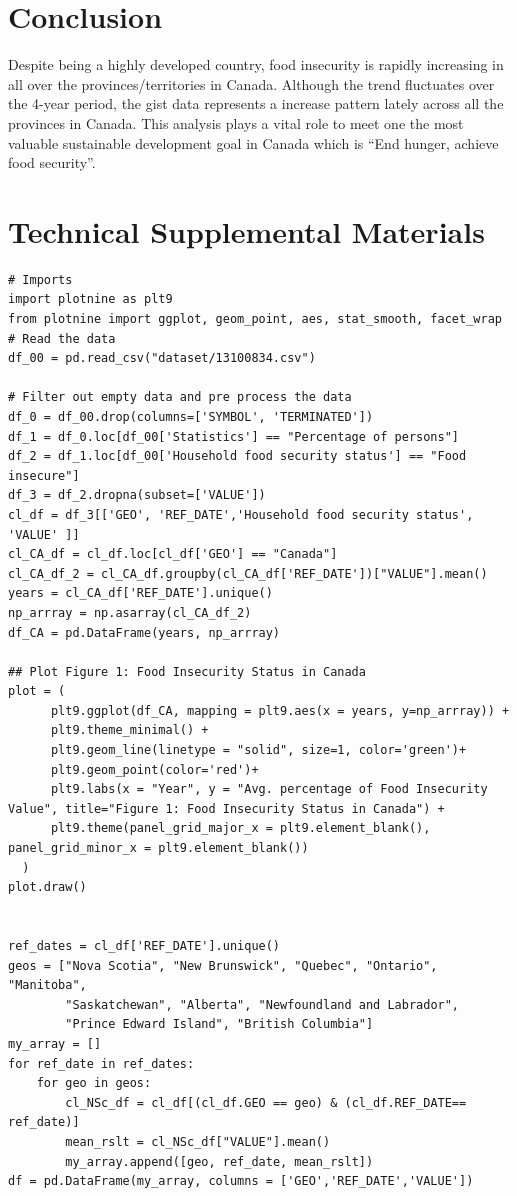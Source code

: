 \documentclass[11pt]{article}
\begin{document}
\section{Conclusion}
Despite being a highly developed country, food insecurity is rapidly increasing in all over the provinces/territories in Canada. Although the trend fluctuates over the 4-year period, the gist data represents a increase pattern lately across all the provinces in Canada. This analysis plays a vital role to meet one the most valuable sustainable development goal in Canada which is ``End hunger, achieve food security''. 

\newpage
\section{Technical Supplemental Materials}
\begin{verbatim}
# Imports
import plotnine as plt9
from plotnine import ggplot, geom_point, aes, stat_smooth, facet_wrap
# Read the data
df_00 = pd.read_csv("dataset/13100834.csv")

# Filter out empty data and pre process the data
df_0 = df_00.drop(columns=['SYMBOL', 'TERMINATED'])
df_1 = df_0.loc[df_00['Statistics'] == "Percentage of persons"]
df_2 = df_1.loc[df_00['Household food security status'] == "Food insecure"]
df_3 = df_2.dropna(subset=['VALUE'])
cl_df = df_3[['GEO', 'REF_DATE','Household food security status', 'VALUE' ]]
cl_CA_df = cl_df.loc[cl_df['GEO'] == "Canada"]
cl_CA_df_2 = cl_CA_df.groupby(cl_CA_df['REF_DATE'])["VALUE"].mean()
years = cl_CA_df['REF_DATE'].unique()
np_arrray = np.asarray(cl_CA_df_2)
df_CA = pd.DataFrame(years, np_arrray)

## Plot Figure 1: Food Insecurity Status in Canada
plot = (
      plt9.ggplot(df_CA, mapping = plt9.aes(x = years, y=np_arrray)) +
      plt9.theme_minimal() +
      plt9.geom_line(linetype = "solid", size=1, color='green')+
      plt9.geom_point(color='red')+
      plt9.labs(x = "Year", y = "Avg. percentage of Food Insecurity Value", title="Figure 1: Food Insecurity Status in Canada") +
      plt9.theme(panel_grid_major_x = plt9.element_blank(), panel_grid_minor_x = plt9.element_blank())
  )
plot.draw()


ref_dates = cl_df['REF_DATE'].unique()
geos = ["Nova Scotia", "New Brunswick", "Quebec", "Ontario", "Manitoba", 
        "Saskatchewan", "Alberta", "Newfoundland and Labrador", 
        "Prince Edward Island", "British Columbia"]
my_array = []
for ref_date in ref_dates:
    for geo in geos:
        cl_NSc_df = cl_df[(cl_df.GEO == geo) & (cl_df.REF_DATE== ref_date)]
        mean_rslt = cl_NSc_df["VALUE"].mean()
        my_array.append([geo, ref_date, mean_rslt])
df = pd.DataFrame(my_array, columns = ['GEO','REF_DATE','VALUE'])



\end{verbatim}
\end{document}
